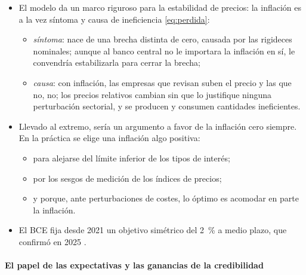 \documentclass[11pt]{article}
\begin{document}
\begin{itemize}
\item El modelo da un marco riguroso para la estabilidad de precios: la inflación es a la vez síntoma y causa de ineficiencia \eqref{eq:perdida}:
  \begin{itemize}
  \item \emph{síntoma}: nace de una brecha distinta de cero, causada por las rigideces nominales; aunque al banco central no le importara la inflación en sí, le convendría estabilizarla para cerrar la brecha;
  \item \emph{causa}: con inflación, las empresas que revisan suben el precio y las que no, no; los precios relativos cambian sin que lo justifique ninguna perturbación sectorial, y se producen y consumen cantidades ineficientes.
  \end{itemize}
\item Llevado al extremo, sería un argumento a favor de la inflación cero siempre. En la práctica se elige una inflación algo positiva:
  \begin{itemize}
  \item para alejarse del límite inferior de los tipos de interés;
  \item por los sesgos de medición de los índices de precios;
  \item y porque, ante perturbaciones de costes, lo óptimo es acomodar en parte la inflación.
  \end{itemize}
\item El BCE fija desde 2021 un objetivo simétrico del 2~\% a medio plazo, que confirmó en 2025\nocite{BCE2021Estrategia,BCE2025Estrategia} .
\end{itemize}

\paragraph{El papel de las expectativas y las ganancias de la credibilidad}
\end{document}
